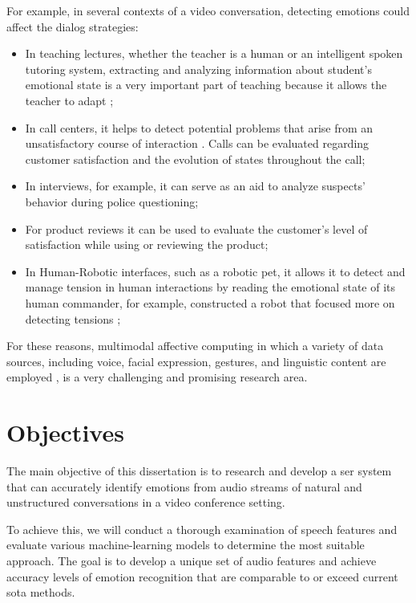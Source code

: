 For example, in several contexts of a video conversation, detecting emotions could affect the dialog strategies:
\begin{itemize}
	\item In teaching lectures, whether the teacher is a human or an intelligent spoken tutoring system, extracting and analyzing information about student's emotional state is a very important part of teaching because it allows the teacher to adapt \cite{teachexample};
	\item In call centers, it helps to detect potential problems that arise from an unsatisfactory course of interaction \cite{ccexample1, ccexample2, ccexample3}. Calls can be evaluated regarding customer satisfaction and the evolution of states throughout the call;
	\item In interviews, for example, it can serve as an aid to analyze suspects' behavior during police questioning;
	\item For product reviews it can be used to evaluate the customer's level of satisfaction while using or reviewing the product;
	\item In Human-Robotic interfaces, such as a robotic pet, it allows it to detect and manage tension in human interactions by reading the emotional state of its human commander, for example, \citeauthor{Kanda2005} constructed a robot that focused more on detecting tensions \cite{Kanda2005};
\end{itemize}

For these reasons, multimodal affective computing in which a variety of data sources, including voice, facial expression, gestures, and linguistic content are employed \cite{BALAZS201695}, is a very challenging and promising research area.


\section{Objectives}

The main objective of this dissertation is to research and develop a \ac{ser} system that can accurately identify emotions from audio streams of natural and unstructured conversations in a video conference setting.

To achieve this, we will conduct a thorough examination of speech features and evaluate various machine-learning models to determine the most suitable approach. The goal is to develop a unique set of audio features and achieve accuracy levels of emotion recognition that are comparable to or exceed current \ac{sota} methods.

